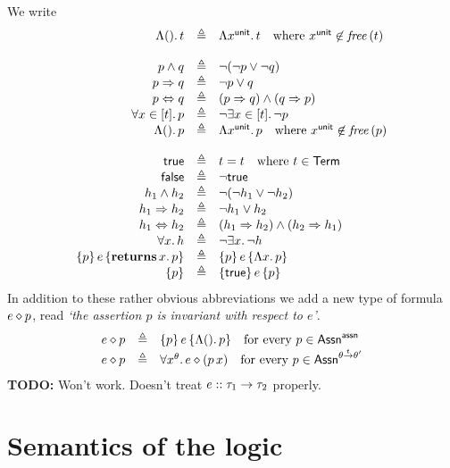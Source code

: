 \documentclass[12pt,a4paper]{report}
\newcommand{\returns}[2]{\ensuremath{\mathbf{returns}\,{#1}.\,{#2}}}
\begin{document}
We write
\[\begin{array}{rcl}
  \tabstr{\unit}{t}
  &\triangleq& \tabstr{x^\tunit}{t} \quad \text{where } x^{\tunit}\not\in\free{t} \\
  \\
  p \wedge q
  &\triangleq& \neg(\neg p \vee \neg q) \\
  p \Rightarrow q
  &\triangleq& \neg p \vee q \\
  p \Leftrightarrow q
  &\triangleq& (p \Rightarrow q) \wedge (q \Rightarrow p) \\
  \qball{x}{t}{p}
  &\triangleq& \neg\qbex{x}{t}{\neg p} \\
  \tabstr{\unit}{p}
  &\triangleq& \tabstr{x^\tunit}{p} \quad \text{where } x^{\tunit}\not\in\free{p} \\
  \\
  \true
  &\triangleq& t = t \quad \text{where } t \in \Term \\
  \false
  &\triangleq& \neg \true \\
  h_1 \wedge h_2
  &\triangleq& \neg(\neg h_1 \vee \neg h_2) \\
  h_1 \Rightarrow h_2
  &\triangleq& \neg h_1 \vee h_2 \\
  h_1 \Leftrightarrow h_2
  &\triangleq& (h_1 \Rightarrow h_2) \wedge (h_2 \Rightarrow h_1) \\
  \qall{x}{h}
  &\triangleq& \neg\qex{x}{\neg h} \\
  \triple{p}{e}{\returns{x}{p}}
  &\triangleq& \triple{p}{e}{\tabstr{x}{p}} \\
  \{p\}
  &\triangleq& \triple{\true}{e}{p}
\end{array}\]
In addition to these rather obvious abbreviations we add a new type of formula
${{e}\diamond{p}}$, read {\em `the assertion $p$ is invariant with respect to $e$'}.
\[\begin{array}{rcll}
  {{e}\diamond{p}} &\triangleq& \{p\}\,e\,\{\Lambda \mathsf{()}.\,p\} \quad \text{for every } p\in\mathsf{Assn}^{\mathsf{assn}} \\
  {{e}\diamond{p}} &\triangleq& \forall x^\theta.\,{{e}\diamond{(p\,x)}} \quad \text{for every } p\in\mathsf{Assn}^{\theta\stackrel{_t}{\to}\theta'}
\end{array}\]
{\bf TODO:} Won't work. Doesn't treat ${e}\mathrel{::}{\tau_1\to\tau_2}$ properly.



\section{Semantics of the logic}
\end{document}
